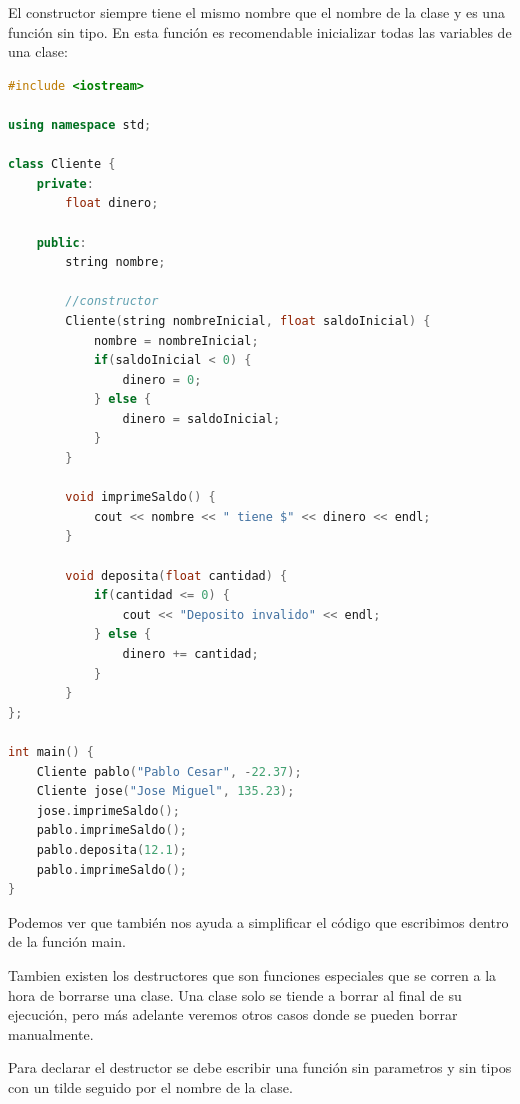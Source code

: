 \documentclass{article}
\begin{document}
El constructor siempre tiene el mismo nombre que el nombre de la clase y es una función sin tipo. En esta función es recomendable inicializar todas las variables de una clase:

\begin{lstlisting}[language=C++, caption=Constructores]
#include <iostream>

using namespace std;

class Cliente {
    private:
        float dinero;

    public:
        string nombre;

        //constructor
        Cliente(string nombreInicial, float saldoInicial) {
            nombre = nombreInicial;
            if(saldoInicial < 0) {
                dinero = 0;
            } else {
                dinero = saldoInicial;
            }
        }

        void imprimeSaldo() {
            cout << nombre << " tiene $" << dinero << endl;
        }

        void deposita(float cantidad) {
            if(cantidad <= 0) {
                cout << "Deposito invalido" << endl;
            } else {
                dinero += cantidad;
            }
        }
};

int main() {
    Cliente pablo("Pablo Cesar", -22.37);
    Cliente jose("Jose Miguel", 135.23);
    jose.imprimeSaldo();
    pablo.imprimeSaldo();
    pablo.deposita(12.1);
    pablo.imprimeSaldo();
}
\end{lstlisting}

Podemos ver que también nos ayuda a simplificar el código que escribimos dentro de la función main.

Tambien existen los destructores que son funciones especiales que se corren a la hora de borrarse una clase. Una clase solo se tiende a borrar al final de su ejecución, pero más adelante veremos otros casos donde se pueden borrar manualmente.

Para declarar el destructor se debe escribir una función sin parametros y sin tipos con un tilde seguido por el nombre de la clase.
\end{document}
